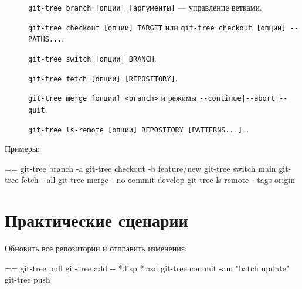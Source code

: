 \documentclass{book}
\makeatletter
\newenvironment{Texinfopreformatted}{%
  \par\GNUTobeylines\obeyspaces\frenchspacing\parskip=\z@\parindent=\z@}{}
{\catcode`\^^M=13 \gdef\GNUTobeylines{\catcode`\^^M=13 \def^^M{\null\par}}}
\newenvironment{Texinfoindented}{\begin{list}{}{}\item\relax}{\end{list}}
\renewcommand{\_}{\Texinfounderscore\discretionary{}{}{}}
\makeatother
\begin{document}
\begin{description}
\item[{\parbox[b]{\linewidth}{%
\texttt{branch}}}]
\texttt{git-tree branch [опции] [аргументы]} — управление ветками.

\item[{\parbox[b]{\linewidth}{%
\texttt{checkout}}}]
\texttt{git-tree checkout [опции] TARGET} или \texttt{git-tree checkout [опции] {-}{-} PATHS...}.

\item[{\parbox[b]{\linewidth}{%
\texttt{switch}}}]
\texttt{git-tree switch [опции] BRANCH}.

\item[{\parbox[b]{\linewidth}{%
\texttt{fetch}}}]
\texttt{git-tree fetch [опции] [REPOSITORY]}.

\item[{\parbox[b]{\linewidth}{%
\texttt{merge}}}]
\texttt{git-tree merge [опции] <branch>} и режимы \texttt{{-}{-}continue|{-}{-}abort|{-}{-}quit}.

\item[{\parbox[b]{\linewidth}{%
\texttt{ls-remote}}}]
\texttt{git-tree ls-remote [опции] REPOSITORY [PATTERNS...] }.
\end{description}

Примеры:
\begin{Texinfoindented}
\begin{Texinfopreformatted}%
\ttfamily git-tree branch -a
git-tree checkout -b feature/new
git-tree switch main
git-tree fetch {-}{-}all
git-tree merge {-}{-}no-commit develop
git-tree ls-remote {-}{-}tags origin
\end{Texinfopreformatted}
\end{Texinfoindented}

\chapter{{Практические сценарии}}
\label{anchor:_041f_0440_0430_043a_0442_0438_0447_0435_0441_043a_0438_0435-_0441_0446_0435_043d_0430_0440_0438_0438}%

Обновить все репозитории и отправить изменения:
\begin{Texinfoindented}
\begin{Texinfopreformatted}%
\ttfamily git-tree pull
git-tree add {-}{-} *.lisp *.asd
git-tree commit -am "batch update"
git-tree push
\end{Texinfopreformatted}
\end{Texinfoindented}
\end{document}
